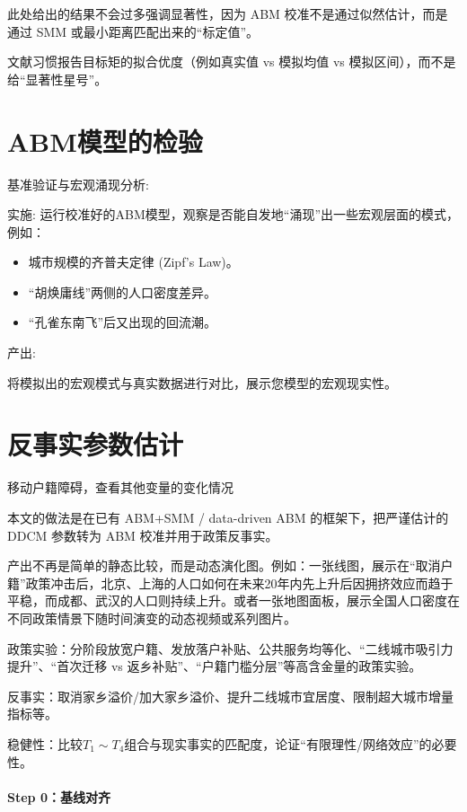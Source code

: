 \documentclass[
  a4paper,
  zihao=-4,
  fontset=mac,
  AutoFakeBold,
  AutoFakeSlant,
  oneside]{ctexbook}
\begin{document}
此处给出的结果不会过多强调显著性，因为 ABM 校准不是通过似然估计，而是通过 SMM 或最小距离匹配出来的“标定值”。

文献习惯报告目标矩的拟合优度（例如真实值 vs 模拟均值 vs 模拟区间），而不是给“显著性星号”。



\section{ABM模型的检验} %
\label{sub:abm模型的检验}


基准验证与宏观涌现分析:

实施: 运行校准好的ABM模型，观察是否能自发地“涌现”出一些宏观层面的模式，例如：
\begin{itemize}
  \item 城市规模的齐普夫定律 (Zipf's Law)。
  \item “胡焕庸线”两侧的人口密度差异。
  \item “孔雀东南飞”后又出现的回流潮。
\end{itemize}




产出: 

将模拟出的宏观模式与真实数据进行对比，展示您模型的宏观现实性。




\section{反事实参数估计}
移动户籍障碍，查看其他变量的变化情况


本文的做法是在已有 ABM+SMM / data-driven ABM 的框架下，把严谨估计的 DDCM 参数转为 ABM 校准并用于政策反事实。

产出不再是简单的静态比较，而是动态演化图。例如：一张线图，展示在“取消户籍”政策冲击后，北京、上海的人口如何在未来20年内先上升后因拥挤效应而趋于平稳，而成都、武汉的人口则持续上升。或者一张地图面板，展示全国人口密度在不同政策情景下随时间演变的动态视频或系列图片。



政策实验：分阶段放宽户籍、发放落户补贴、公共服务均等化、“二线城市吸引力提升”、“首次迁移 vs 返乡补贴”、“户籍门槛分层”等高含金量的政策实验。

反事实：取消家乡溢价/加大家乡溢价、提升二线城市宜居度、限制超大城市增量指标等。

稳健性：比较$T_1\sim T_4$组合与现实事实的匹配度，论证“有限理性/网络效应”的必要性。



\paragraph{Step 0：基线对齐}
\end{document}
